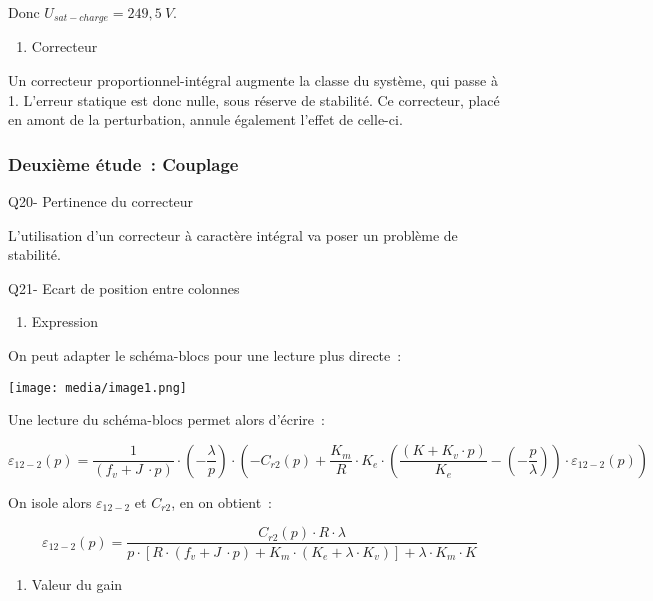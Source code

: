 \documentclass[]{article}
\begin{document}
Donc \(U_{sat - charge} = 249,5\ V\).

\begin{enumerate}
\def\labelenumi{\alph{enumi}.}
\item
  Correcteur
\end{enumerate}

Un correcteur proportionnel-intégral augmente la classe du système, qui
passe à 1. L'erreur statique est donc nulle, sous réserve de stabilité.
Ce correcteur, placé en amont de la perturbation, annule également
l'effet de celle-ci.

\subsubsection{Deuxième étude~:
Couplage}\label{deuxiuxe8me-uxe9tude-couplage}

Q20- Pertinence du correcteur

L'utilisation d'un correcteur à caractère intégral va poser un problème
de stabilité.

Q21- Ecart de position entre colonnes

\begin{enumerate}
\def\labelenumi{\alph{enumi}.}
\item
  Expression
\end{enumerate}

On peut adapter le schéma-blocs pour une lecture plus directe~:

\texttt{[image: media/image1.png]}

Une lecture du schéma-blocs permet alors d'écrire~:

\[\varepsilon_{12 - 2}\left( p \right) = \frac{1}{\left( f_{v} + J\  \cdot p \right)} \cdot \left( - \frac{\lambda}{p} \right) \cdot \left( - C_{r2}\left( p \right) + \frac{K_{m}}{R} \cdot K_{e} \cdot \left( \frac{\left( K + K_{v} \cdot p \right)}{K_{e}} - \left( - \frac{p}{\lambda} \right) \right) \cdot \varepsilon_{12 - 2}\left( p \right) \right)\]

On isole alors \(\varepsilon_{12 - 2}\) et \(C_{r2}\), en on obtient~:

\[\varepsilon_{12 - 2}\left( p \right) = \frac{C_{r2}\left( p \right) \cdot R \cdot \lambda}{p \cdot \left\lbrack R \cdot \left( f_{v} + J\  \cdot p \right) + K_{m} \cdot \left( K_{e} + \lambda \cdot K_{v} \right) \right\rbrack + \lambda \cdot K_{m} \cdot K}\]

\begin{enumerate}
\def\labelenumi{\alph{enumi}.}
\item
  Valeur du gain
\end{enumerate}
\end{document}
